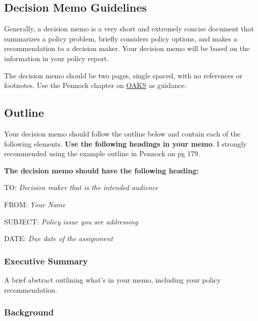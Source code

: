 \hypertarget{decision-memo-guidelines}{%
\subsection{Decision Memo Guidelines}\label{decision-memo-guidelines}}

Generally, a decision memo is a very short and extremely concise
document that summarizes a policy problem, briefly considers policy
options, and makes a recommendation to a decision maker. Your decision
memo will be based on the information in your policy report.

\vspace{0.10in}
\noindent The decision memo should be two pages, single spaced, with no
references or footnotes. Use the Pennock chapter on
\href{https://lms.cofc.edu/d2l/home}{OAKS} as guidance.

\hypertarget{outline}{%
\subsection{Outline}\label{outline}}

Your decision memo should follow the outline below and contain each of
the following elements. \textbf{Use the following headings in your
memo}. I strongly recommended using the example outline in Pennock on pg
179.

\vspace{0.10in}
\noindent \textbf{The decision memo should have the following heading:}

\vspace{0.10in}
\noindent TO: \emph{Decision maker that is the intended audience}

\noindent FROM: \emph{Your Name}

\noindent SUBJECT: \emph{Policy issue you are addressing}

\noindent DATE: \emph{Due date of the assignment}

\hypertarget{executive-summary}{%
\subsubsection{Executive Summary}\label{executive-summary}}

A brief abstract outlining what's in your memo, including your policy
recommendation.

\hypertarget{background}{%
\subsubsection{Background}\label{background}}

